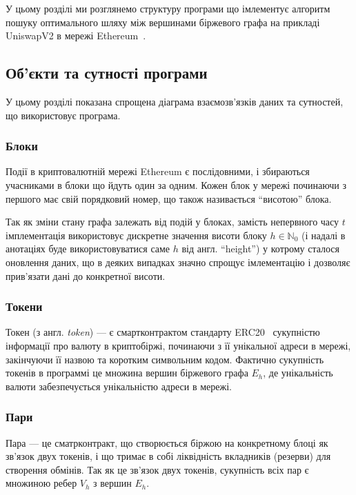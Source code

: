 \documentclass[../index.tex]{subfiles}
\begin{document}
У цьому розділі ми розглянемо структуру програми що імлементує алгоритм пошуку
оптимального шляху між вершинами біржевого графа на прикладі UniswapV2 в мережі
Ethereum~\cite{ethereum}.

\subsection{Об'єкти та сутності програми}

У цьому розділі показана спрощена діаграма взаємозв'язків даних та сутностей, що
використовує програма.

\subsubsection{Блоки}

Події в криптовалютній мережі Ethereum є послідовними, і збираються учасниками в
блоки що йдуть один за одним. Кожен блок у мережі починаючи з першого має свій
порядковий номер, що також називається ``висотою'' блока.

Так як зміни стану графа залежать від подій у блоках, замість непервного часу
$t$ імплементація використовує дискретне значення висоти блоку $h \in \mathbb{N}_{0}$ (і
надалі в анотаціях буде використовуватися саме $h$ від англ. ``height'') у
котрому сталося оновлення даних, що в деяких випадках значно спрощує
імлементацію і дозволяє прив'язати дані до конкретної висоти.

\subsubsection{Токени}

Токен (з англ. \textit{token}) --- є смартконтрактом стандарту ERC20~\cite{erc20}
сукупністю інформації про валюту в криптобіржі, починаючи з її унікальної адреси
в мережі, закінчуючи її назвою та коротким символьним кодом. Фактично сукупність
токенів в программі це множина вершин біржевого графа $E_{h}$, де унікальність
валюти забезпечується унікальністю адреси в мережі.

\subsubsection{Пари}

Пара --- це сматрконтракт, що створюється біржою на конкретному блоці як зв'язок
двух токенів, і що тримає в собі ліквідність вкладників (резерви) для створення
обмінів. Так як це зв'язок двух токенів, сукупність всіх пар є множиною ребер
$V_{h}$ з вершин $E_{h}$.
\end{document}
